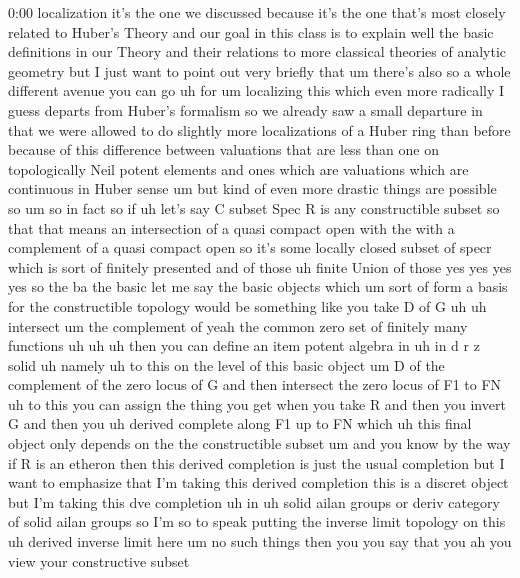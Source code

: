 \begin{unfinished}{0:00}
localization  it's  the  one  we  discussed
because  it's  the  one  that's  most  closely
related  to  Huber's  Theory  and  our  goal
in  this  class  is  to  explain  well  the
basic  definitions  in  our  Theory  and
their  relations  to  more  classical
theories  of  analytic  geometry  but  I  just
want  to  point  out  very  briefly  that  um
there's  also  so  a  whole  different  avenue
you  can  go  uh
for
um  localizing  this  which  even  more
radically  I  guess  departs  from  Huber's
formalism  so  we  already  saw  a  small
departure  in  that  we  were  allowed  to  do
slightly  more  localizations  of  a  Huber
ring  than  before  because  of  this
difference  between  valuations  that  are
less  than  one  on  topologically  Neil
potent  elements  and  ones  which  are
valuations  which  are  continuous  in  Huber
sense  um  but  kind  of  even  more  drastic
things  are  possible
so
um  so  in
fact  so  if  uh  let's  say  C  subset  Spec
R  is  any  constructible
subset  so  that  that  means  an
intersection  of  a  quasi  compact  open
with  the  with  a  complement  of  a  quasi
compact  open  so  it's  some  locally  closed
subset  of  specr  which  is  sort  of
finitely  presented  and  of  those  uh
finite  Union  of  those  yes  yes  yes  yes  so
the  ba  the  basic  let  me  say  the  basic
objects  which  um  sort  of  form  a  basis
for  the  constructible  topology  would  be
something  like  you  take  D  of  G
uh  uh
intersect
um  the  complement  of  yeah  the  common
zero  set  of  finitely  many
functions
uh
uh  uh  then  you  can  define  an  item  potent
algebra  in  uh  in  d  r  z
solid  uh
namely  uh  to  this  on  the  level  of  this
basic
object
um  D  of  the  complement  of  the  zero  locus
of  G  and  then  intersect  the  zero  locus
of  F1  to  FN  uh  to  this  you  can  assign
the  thing  you  get  when  you  take  R  and
then  you  invert  G  and  then  you  uh
derived  complete  along  F1  up  to
FN  which  uh  this  final  object  only
depends  on  the  the  constructible
subset
um  and  you  know  by  the  way  if  R  is  an
etheron  then  this  derived  completion  is
just  the  usual  completion  but  I  want  to
emphasize  that  I'm  taking  this  derived
completion  this  is  a  discret  object  but
I'm  taking  this  dve  completion  uh  in  uh
solid  ailan  groups  or  deriv  category  of
solid  ailan  groups  so  I'm  so  to  speak
putting  the  inverse  limit  topology  on
this  uh  derived  inverse  limit  here
um  no  such  things  then  you  you  say  that
you  ah  you  view  your  constructive  subset

\end{unfinished}
